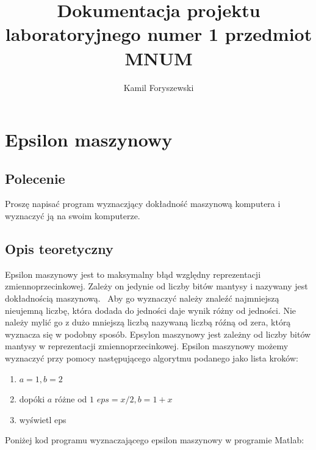 \documentclass[a4paper, 11pt]{article}
\author{Kamil Foryszewski}
\title{Dokumentacja projektu laboratoryjnego numer 1 przedmiot MNUM}
\begin{document}

\maketitle
\tableofcontents


\section{Epsilon maszynowy}

\subsection{Polecenie}
Proszę napisać program wyznaczjący dokładność maszynową komputera i wyznaczyć ją na swoim komputerze.
\vspace{0,5cm}

\subsection{Opis teoretyczny}
\indent

Epsilon maszynowy jest to maksymalny błąd względny reprezentacji zmiennoprzecinkowej. Zależy on jedynie od liczby bitów mantysy i nazywany jest dokładnością maszynową.~\cite{first} Aby go wyznaczyć należy znaleźć najmniejszą nieujemną liczbę, która dodada do jedności daje wynik różny od jedności. Nie należy mylić go z dużo mniejszą liczbą nazywaną liczbą róźną od zera, którą wyznacza się w podobny sposób. Epsylon maszynowy jest zależny od liczby bitów mantysy w reprezentacji zmiennoprzecinkowej. Epsilon maszynowy możemy wyznaczyć przy pomocy następującego algorytmu podanego jako lista kroków:
\begin{enumerate}
  \item $a = 1, b = 2$
  \item dopóki $a$ różne od $1$ $eps = x/2, b = 1 + x$
  \item wyświetl eps
\end{enumerate} 
Poniżej kod programu wyznaczającego epsilon maszynowy w programie Matlab:
\end{document}
